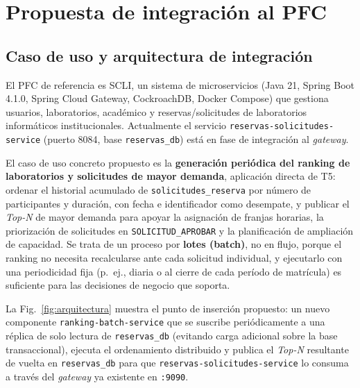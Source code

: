 \documentclass[10pt,conference]{IEEEtran}
\begin{document}
\section{Propuesta de integración al PFC}
\label{sec:propuesta}

\subsection{Caso de uso y arquitectura de integración}

El PFC de referencia es SCLI, un sistema de microservicios (Java 21, Spring Boot 4.1.0, Spring Cloud Gateway, CockroachDB, Docker Compose) que gestiona usuarios, laboratorios, académico y reservas/solicitudes de laboratorios informáticos institucionales. Actualmente el servicio \texttt{reservas-solicitudes-service} (puerto 8084, base \texttt{reservas\_db}) está en fase de integración al \textit{gateway}.

El caso de uso concreto propuesto es la \textbf{generación periódica del ranking de laboratorios y solicitudes de mayor demanda}, aplicación directa de T5: ordenar el historial acumulado de \texttt{solicitudes\_reserva} por número de participantes y duración, con fecha e identificador como desempate, y publicar el \textit{Top-N} de mayor demanda para apoyar la asignación de franjas horarias, la priorización de solicitudes en \texttt{SOLICITUD\_APROBAR} y la planificación de ampliación de capacidad. Se trata de un proceso por \textbf{lotes (batch)}, no en flujo, porque el ranking no necesita recalcularse ante cada solicitud individual, y ejecutarlo con una periodicidad fija (p.\ ej., diaria o al cierre de cada período de matrícula) es suficiente para las decisiones de negocio que soporta.

La Fig.~\ref{fig:arquitectura} muestra el punto de inserción propuesto: un nuevo componente \texttt{ranking-batch-service} que se suscribe periódicamente a una réplica de solo lectura de \texttt{reservas\_db} (evitando carga adicional sobre la base transaccional), ejecuta el ordenamiento distribuido y publica el \textit{Top-N} resultante de vuelta en \texttt{reservas\_db} para que \texttt{reservas-solicitudes-service} lo consuma a través del \textit{gateway} ya existente en \texttt{:9090}.
\end{document}
